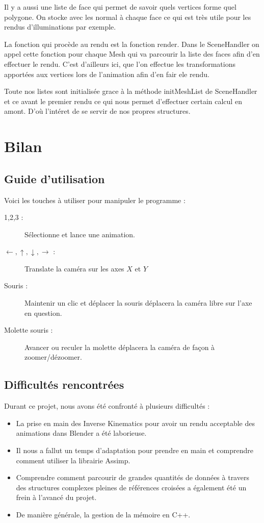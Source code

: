 \documentclass[a4paper]{report}
\begin{document}
    Il y a aussi une liste de face qui permet de savoir quels vertices forme quel polygone. On stocke avec les normal à chaque face ce qui est très utile pour les rendus d'illuminations par exemple.

    La fonction qui procède au rendu est la fonction render. Dans le SceneHandler on appel cette fonction pour chaque Mesh qui va parcourir la liste des faces afin d'en effectuer le rendu. C'est d'ailleurs ici, que l'on effectue les transformations apportées aux vertices lors de l'animation afin d'en fair ele rendu.

    Toute nos listes sont initialisée grace à la méthode initMeshList de SceneHandler et ce avant le premier rendu ce qui nous permet d'effectuer certain calcul en amont. D'où l'intéret de se servir de nos propres structures.

\par


\newpage
\chapter{Bilan}
\section{Guide d'utilisation}
Voici les touches à utiliser pour manipuler le programme :
\begin{description}
	\item[1,2,3 :] Sélectionne et lance une animation.
	\item[$\leftarrow,\uparrow,\downarrow,\rightarrow$ :] Translate la caméra sur les axes $X$ et $Y$
	\item[Souris :] Maintenir un clic et déplacer la souris déplacera la caméra libre sur l'axe en question.
	\item[Molette souris :] Avancer ou reculer la molette déplacera la caméra de façon à zoomer/dézoomer.
\end{description}
\section{Difficultés rencontrées}
\par
Durant ce projet, nous avons été confronté à plusieurs difficultés :
\begin{itemize}
\item La prise en main des Inverse Kinematics pour avoir un rendu acceptable des animations dans Blender a été laborieuse.
\item Il nous a fallut un temps d'adaptation pour prendre en main et comprendre comment utiliser la librairie Assimp.
\item Comprendre comment parcourir de grandes quantités de données à travers des structures complexes pleines de références croisées a également été un frein à l'avancé du projet.
\item De manière générale, la gestion de la mémoire en C++.
\end{itemize}
\end{document}
